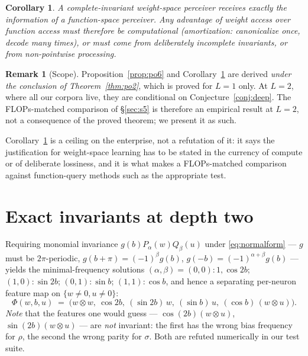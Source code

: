 \documentclass[10pt,letterpaper]{article}
\newtheorem{corollary}[theorem]{Corollary}
\theoremstyle{definition}
\newtheorem{remark}[theorem]{Remark}
\begin{document}
\begin{corollary}\label{cor:ceiling}
A complete-invariant weight-space perceiver receives \emph{exactly} the information of a
function-space perceiver. Any advantage of weight access over function access must therefore be
computational (amortization: canonicalize once, decode many times), or must come from
deliberately \emph{incomplete} invariants, or from non-pointwise processing.
\end{corollary}

\begin{remark}[Scope]\label{rem:scope}
Proposition~\ref{prop:po6} and Corollary~\ref{cor:ceiling} are derived \emph{under the conclusion
of Theorem~\ref{thm:po2}}, which is proved for $L=1$ only. At $L=2$, where all our corpora live,
they are conditional on Conjecture~\ref{conj:deep}. The FLOPs-matched comparison of
\S\ref{sec:s5} is therefore an empirical result at $L=2$, not a consequence of the proved theorem;
we present it as such.
\end{remark}

Corollary~\ref{cor:ceiling} is a ceiling on the enterprise, not a refutation of it: it says the
justification for weight-space learning has to be stated in the currency of compute or of
deliberate lossiness, and it is what makes a FLOPs-matched comparison against function-query
methods such as \citet{horwitz2025probegen} the appropriate test.

\section{Exact invariants at depth two}\label{sec:deep}

Requiring monomial invariance $g(b)P_\alpha(w)Q_\beta(u)$ under \eqref{eq:normalform} --- $g$
must be $2\pi$-periodic, $g(b+\pi) = (-1)^\beta g(b)$, $g(-b)=(-1)^{\alpha+\beta}g(b)$ --- yields
the minimal-frequency solutions $(\alpha,\beta) = (0,0) : 1, \cos 2b$; $(1,0): \sin 2b$;
$(0,1): \sin b$; $(1,1): \cos b$, and hence a separating per-neuron feature map on
$\{w\neq0,u\neq0\}$:
\begin{equation}
\Phi(w,b,u) \;=\; \Big( w\otimes w,\ \cos 2b,\ (\sin 2b)\,w,\ (\sin b)\,u,\ (\cos b)\,(w\otimes u)\Big).
\label{eq:phi}
\end{equation}
\emph{Note} that the features one would guess --- $\cos(2b)(w\otimes u)$, $\sin(2b)(w\otimes u)$
--- are \emph{not} invariant: the first has the wrong bias frequency for $\rho$, the second the
wrong parity for $\sigma$. Both are refuted numerically in our test suite.
\end{document}
